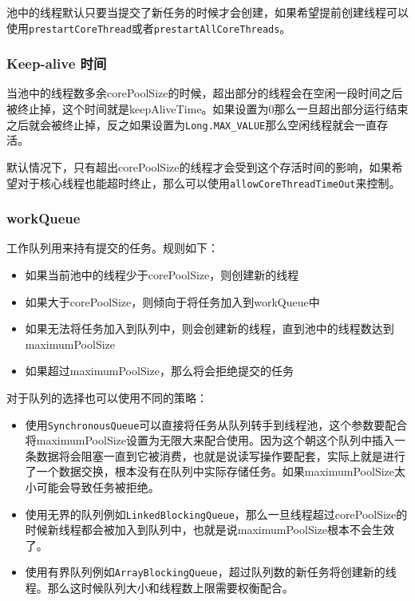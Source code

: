 \documentclass[12pt]{article}
\begin{document}
池中的线程默认只要当提交了新任务的时候才会创建，如果希望提前创建线程可以使用\texttt{prestartCoreThread}或者\texttt{prestartAllCoreThreads}。

\subsubsection{Keep-alive 时间}\label{keep-alive-ux65f6ux95f4}

当池中的线程数多余corePoolSize的时候，超出部分的线程会在空闲一段时间之后被终止掉，这个时间就是keepAliveTime。如果设置为0那么一旦超出部分运行结束之后就会被终止掉，反之如果设置为\texttt{Long.MAX\_VALUE}那么空闲线程就会一直存活。

默认情况下，只有超出corePoolSize的线程才会受到这个存活时间的影响，如果希望对于核心线程也能超时终止，那么可以使用\texttt{allowCoreThreadTimeOut}来控制。

\subsubsection{workQueue}\label{workqueue}

工作队列用来持有提交的任务。规则如下：

\begin{itemize}
\tightlist
\item
  如果当前池中的线程少于corePoolSize，则创建新的线程
\item
  如果大于corePoolSize，则倾向于将任务加入到workQueue中
\item
  如果无法将任务加入到队列中，则会创建新的线程，直到池中的线程数达到maximumPoolSize
\item
  如果超过maximumPoolSize，那么将会拒绝提交的任务
\end{itemize}

对于队列的选择也可以使用不同的策略：

\begin{itemize}
\tightlist
\item
  使用\texttt{SynchronousQueue}可以直接将任务从队列转手到线程池，这个参数要配合将maximumPoolSize设置为无限大来配合使用。因为这个朝这个队列中插入一条数据将会阻塞一直到它被消费，也就是说读写操作要配套，实际上就是进行了一个数据交换，根本没有在队列中实际存储任务。如果maximumPoolSize太小可能会导致任务被拒绝。
\item
  使用无界的队列例如\texttt{LinkedBlockingQueue}，那么一旦线程超过corePoolSize的时候新线程都会被加入到队列中，也就是说maximumPoolSize根本不会生效了。
\item
  使用有界队列例如\texttt{ArrayBlockingQueue}，超过队列数的新任务将创建新的线程。那么这时候队列大小和线程数上限需要权衡配合。
\end{itemize}
\end{document}
